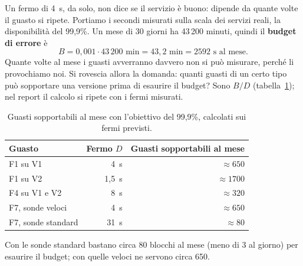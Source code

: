 Un fermo di 4~s, da solo, non dice se il servizio è buono: dipende da quante volte il guasto si ripete. Portiamo i secondi misurati sulla scala dei servizi reali, la disponibilità del 99,9\%. Un mese di 30 giorni ha 43\,200 minuti, quindi il \textbf{budget di errore} è
\[
B = 0{,}001 \cdot 43\,200 \text{ min} = 43{,}2 \text{ min} = 2592 \text{ s al mese.}
\]
Quante volte al mese i guasti avverranno davvero non si può misurare, perché li provochiamo noi. Si rovescia allora la domanda: quanti guasti di un certo tipo può sopportare una versione prima di esaurire il budget? Sono $B / D$ (tabella~\ref{tab:sopportabili}); nel report il calcolo si ripete con i fermi misurati.

\begin{table}[H]
\centering
\caption{Guasti sopportabili al mese con l'obiettivo del 99,9\%, calcolati sui fermi previsti.}
\label{tab:sopportabili}
\begin{tabular}{@{}lrr@{}}
\toprule
\textbf{Guasto} & \textbf{Fermo $D$} & \textbf{Guasti sopportabili al mese} \\
\midrule
F1 su V1 & 4~s & $\approx 650$ \\
F1 su V2 & 1,5~s & $\approx 1700$ \\
F4 su V1 e V2 & 8~s & $\approx 320$ \\
F7, sonde veloci & 4~s & $\approx 650$ \\
F7, sonde standard & 31~s & $\approx 80$ \\
\bottomrule
\end{tabular}
\end{table}

Con le sonde standard bastano circa 80 blocchi al mese (meno di 3 al giorno) per esaurire il budget; con quelle veloci ne servono circa 650.
